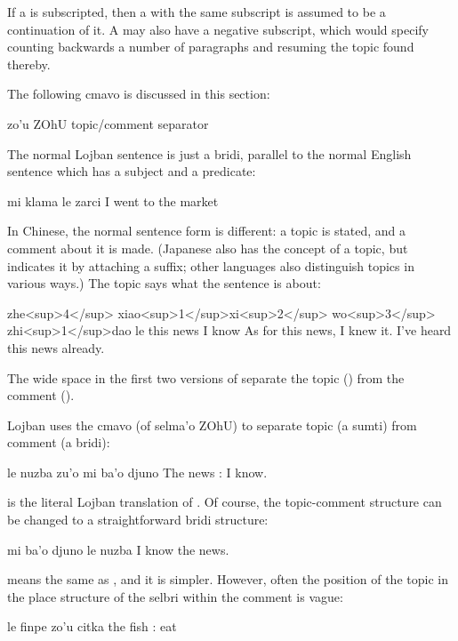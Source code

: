 If a  is subscripted, then a  with the same
    subscript is assumed to be a continuation of it. A  may
    also have a negative subscript, which would specify counting
    backwards a number of paragraphs and resuming the topic found
    thereby.



The following cmavo is discussed in this section:

   zo'u    ZOhU    topic/comment separator

The normal Lojban sentence is just a bridi, parallel to the
    normal English sentence which has a subject and a
    predicate:
\begin{example}
mi klama le zarci\n
I went to the market
\end{example}

In Chinese, the normal sentence form is different: a topic is
    stated, and a comment about it is made. (Japanese also has the
    concept of a topic, but indicates it by attaching a suffix;
    other languages also distinguish topics in various ways.) The
    topic says what the sentence is about:
\begin{example}
zhe<sup>4</sup> xiao<sup>1</sup>xi<sup>2</sup>   wo<sup>3</sup> zhi<sup>1</sup>dao le\n
this news   I know \n
As for this news, I knew it.\n
I've heard this news already.
\end{example}

The wide space in the first two versions of  separate the topic ()
    from the comment (). 

Lojban uses the cmavo  (of selma'o ZOhU) to separate
    topic (a sumti) from comment (a bridi):
\begin{example}
le nuzba zu'o mi ba'o djuno\n
The news : I  know.
\end{example}

 is the literal Lojban
    translation of . Of course, the
    topic-comment structure can be changed to a straightforward
    bridi structure:
\begin{example}
mi ba'o djuno le nuzba\n
I  know the news.
\end{example}

 means the same as , and it is simpler. However, often
    the position of the topic in the place structure of the selbri
    within the comment is vague:
\begin{example}
le finpe zo'u citka\n
the fish : eat
\end{example}

